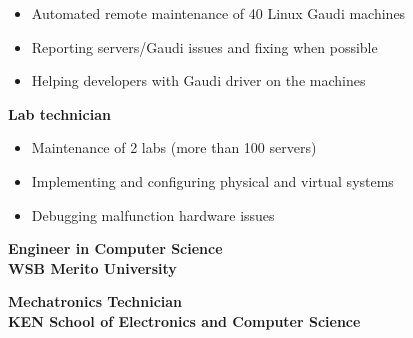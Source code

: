 \documentclass[10pt,a4paper,ragged2e,withhyper]{altacv}
\begin{document}
\begin{paracol}{2}
\begin{itemize}
\item Automated remote maintenance of 40 Linux Gaudi machines
\item Reporting servers/Gaudi issues and fixing when possible
\item Helping developers with Gaudi driver on the machines
\end{itemize}

\medskip

\textbf{\textcolor{accent}{Lab technician}} \hfill {}
\smallskip

\begin{itemize}
\item Maintenance of 2 labs (more than 100 servers)
\item Implementing and configuring physical and virtual systems
\item Debugging malfunction hardware issues
\end{itemize}





\medskip


\large\textbf{Engineer in Computer Science} \normalsize \hfill {}\\
\textbf{\textcolor{accent}{WSB Merito University}} \hfill {}\\

\divider

\large\textbf{Mechatronics Technician} \normalsize \hfill {}\\
\textbf{\textcolor{accent}{KEN School of Electronics and Computer Science}} \hfill {}\\




\end{paracol}
\end{document}
